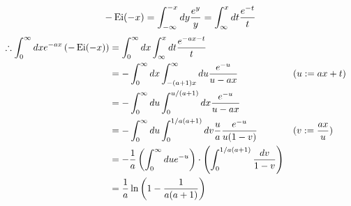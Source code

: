 \item

\[
    -\operatorname{Ei}(-x)
    = \int_{-\infty}^{-x} dy \frac{e^y}{y}
    = \int_\infty^x dt \frac{e^{-t}}{t}
\]
\begin{align*}
    \therefore \int_0^\infty dx e^{-ax} \left( -\operatorname{Ei}(-x) \right)
    &= \int_0^\infty dx \int_{\infty}^x dt \frac{e^{-ax - t}}{t} \\
    &= -\int_0^\infty dx \int_{-(a + 1)x}^\infty du \frac{e^{-u}}{u - ax} && (u := ax + t) \\
    &= -\int_0^\infty du \int_0^{u / (a + 1)} dx \frac{e^{-u}}{u - ax} \\ 
    &= -\int_0^\infty du \int_0^{1/a(a + 1)} dv \frac{u}{a} \frac{e^{-u}}{u(1 - v)} && (v := \frac{ax}{u}) \\
    &= -\frac{1}{a} \left( \int_0^\infty du e^{-u} \right) \cdot \left( \int_0^{1/a(a + 1)} \frac{dv}{1 - v} \right) \\
    &= \frac{1}{a} \ln\left( 1 - \frac{1}{a(a + 1)} \right)
\end{align*}